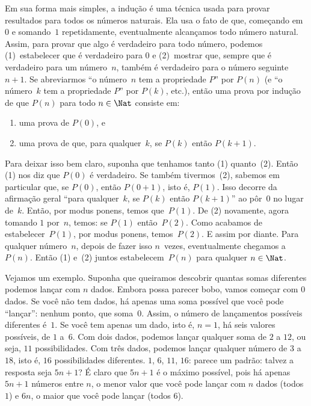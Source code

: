 \documentclass[../../../include/open-logic-section]{subfiles}
\begin{document}


Em sua forma mais simples, a indução é uma técnica usada para provar resultados
para todos os números naturais. Ela usa o fato de que, começando em $0$
e somando~$1$ repetidamente, eventualmente alcançamos todo número natural. Assim,
para provar que algo é verdadeiro para todo número, podemos (1)~estabelecer
que é verdadeiro para $0$ e (2)~mostrar que, sempre que é verdadeiro para um
número~$n$, também é verdadeiro para o número seguinte~$n+1$.  Se
abreviarmos ``o número~$n$ tem a propriedade $P$'' por $P(n)$ (e ``o número~$k$
tem a propriedade $P$'' por $P(k)$, etc.), então uma prova por indução de que
$P(n)$ para todo $n \in \Nat$ consiste em:
\begin{enumerate}
\item uma prova de $P(0)$, e
\item uma prova de que, para qualquer~$k$, se $P(k)$ então $P(k+1)$.
\end{enumerate}
Para deixar isso bem claro, suponha que tenhamos tanto (1) quanto~(2).  Então
(1) nos diz que $P(0)$ é verdadeiro.  Se também tivermos~(2), sabemos em
particular que, se $P(0)$, então $P(0+1)$, isto é, $P(1)$. Isso decorre
da afirmação geral ``para qualquer~$k$, se $P(k)$ então $P(k+1)$'' ao
pôr~$0$ no lugar de~$k$. Então, por modus ponens, temos que~$P(1)$. De (2)
novamente, agora tomando $1$ por~$n$, temos: se $P(1)$ então~$P(2)$. Como
acabamos de estabelecer~$P(1)$, por modus ponens, temos~$P(2)$. E assim
por diante.  Para qualquer número~$n$, depois de fazer isso $n$~vezes, eventualmente
chegamos a~$P(n)$.  Então (1) e~(2) juntos estabelecem~$P(n)$ para qualquer $n
\in \Nat$.

Vejamos um exemplo.  Suponha que queiramos descobrir quantas
somas diferentes podemos lançar com $n$ dados.  Embora possa parecer
bobo, vamos começar com $0$ dados.  Se você não tem dados, há apenas uma
soma possível que você pode ``lançar'': nenhum ponto, que soma~$0$. Assim,
o número de lançamentos possíveis diferentes é~$1$. Se você tem apenas um
dado, isto é, $n=1$, há seis valores possíveis, de $1$ a~$6$. Com
dois dados, podemos lançar qualquer soma de $2$ a $12$, ou seja, $11$
possibilidades.  Com três dados, podemos lançar qualquer número de $3$ a
$18$, isto é, $16$ possibilidades diferentes.  $1$, $6$, $11$, $16$: parece
um padrão: talvez a resposta seja $5n+1$?  É claro que $5n+1$ é o
máximo possível, pois há apenas $5n+1$ números entre $n$,
o menor valor que você pode lançar com $n$ dados (todos $1$) e $6n$, o
maior que você pode lançar (todos $6$).
\end{document}
